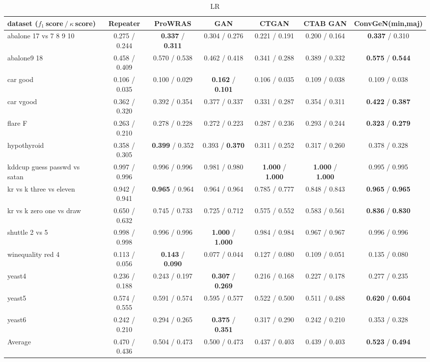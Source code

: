 

\begin{table*}[ht]\scriptsize\caption{LR}\label{tab:results:LR:A}\centering\tabularnewline
\begin{tabular}{l|@{\hskip3pt}c@{\hskip3pt}|@{\hskip3pt}c@{\hskip3pt}|@{\hskip3pt}c@{\hskip3pt}|@{\hskip3pt}c@{\hskip3pt}|@{\hskip3pt}c@{\hskip3pt}|@{\hskip3pt}c@{\hskip3pt}}\hline
\textbf{dataset ($f_1~$score$~/~\kappa~$score)} & \textbf{Repeater} & \textbf{ProWRAS} & \textbf{GAN} & \textbf{CTGAN} & \textbf{CTAB GAN} & \textbf{ConvGeN(min,maj)}
\tabularnewline
\hline
abalone 17 vs 7 8 9 10 &  0.275  /  0.244  &  \textbf{0.337}  /  \textbf{0.311}  &  0.304  /  0.276  &  0.221  /  0.191  &  0.200  /  0.164  &  \textbf{0.337}  /  0.310 
\tabularnewline
abalone9 18 &  0.458  /  0.409  &  0.570  /  0.538  &  0.462  /  0.418  &  0.341  /  0.288  &  0.389  /  0.332  &  \textbf{0.575}  /  \textbf{0.544} 
\tabularnewline
car good &  0.106  /  0.035  &  0.100  /  0.029  &  \textbf{0.162}  /  \textbf{0.101}  &  0.106  /  0.035  &  0.109  /  0.038  &  0.109  /  0.038 
\tabularnewline
car vgood &  0.362  /  0.320  &  0.392  /  0.354  &  0.377  /  0.337  &  0.331  /  0.287  &  0.354  /  0.311  &  \textbf{0.422}  /  \textbf{0.387} 
\tabularnewline
flare F &  0.263  /  0.210  &  0.278  /  0.228  &  0.272  /  0.223  &  0.287  /  0.236  &  0.293  /  0.244  &  \textbf{0.323}  /  \textbf{0.279} 
\tabularnewline
hypothyroid &  0.358  /  0.305  &  \textbf{0.399}  /  0.352  &  0.393  /  \textbf{0.370}  &  0.311  /  0.252  &  0.317  /  0.260  &  0.378  /  0.328 
\tabularnewline
kddcup guess passwd vs satan &  0.997  /  0.996  &  0.996  /  0.996  &  0.981  /  0.980  &  \textbf{1.000}  /  \textbf{1.000}  &  \textbf{1.000}  /  \textbf{1.000}  &  0.995  /  0.995 
\tabularnewline
kr vs k three vs eleven &  0.942  /  0.941  &  \textbf{0.965}  /  0.964  &  0.964  /  0.964  &  0.785  /  0.777  &  0.848  /  0.843  &  \textbf{0.965}  /  \textbf{0.965} 
\tabularnewline
kr vs k zero one vs draw &  0.650  /  0.632  &  0.745  /  0.733  &  0.725  /  0.712  &  0.575  /  0.552  &  0.583  /  0.561  &  \textbf{0.836}  /  \textbf{0.830} 
\tabularnewline
shuttle 2 vs 5 &  0.998  /  0.998  &  0.996  /  0.996  &  \textbf{1.000}  /  \textbf{1.000}  &  0.984  /  0.984  &  0.967  /  0.967  &  0.996  /  0.996 
\tabularnewline
winequality red 4 &  0.113  /  0.056  &  \textbf{0.143}  /  \textbf{0.090}  &  0.077  /  0.044  &  0.127  /  0.080  &  0.109  /  0.051  &  0.135  /  0.080 
\tabularnewline
yeast4 &  0.236  /  0.188  &  0.243  /  0.197  &  \textbf{0.307}  /  \textbf{0.269}  &  0.216  /  0.168  &  0.227  /  0.178  &  0.277  /  0.235 
\tabularnewline
yeast5 &  0.574  /  0.555  &  0.591  /  0.574  &  0.595  /  0.577  &  0.522  /  0.500  &  0.511  /  0.488  &  \textbf{0.620}  /  \textbf{0.604} 
\tabularnewline
yeast6 &  0.242  /  0.210  &  0.294  /  0.265  &  \textbf{0.375}  /  \textbf{0.351}  &  0.317  /  0.290  &  0.242  /  0.210  &  0.353  /  0.328 
\tabularnewline
\hline Average &  0.470  /  0.436  &  0.504  /  0.473  &  0.500  /  0.473  &  0.437  /  0.403  &  0.439  /  0.403  &  \textbf{0.523}  /  \textbf{0.494} 
\tabularnewline
\hline\end{tabular}\end{table*}


